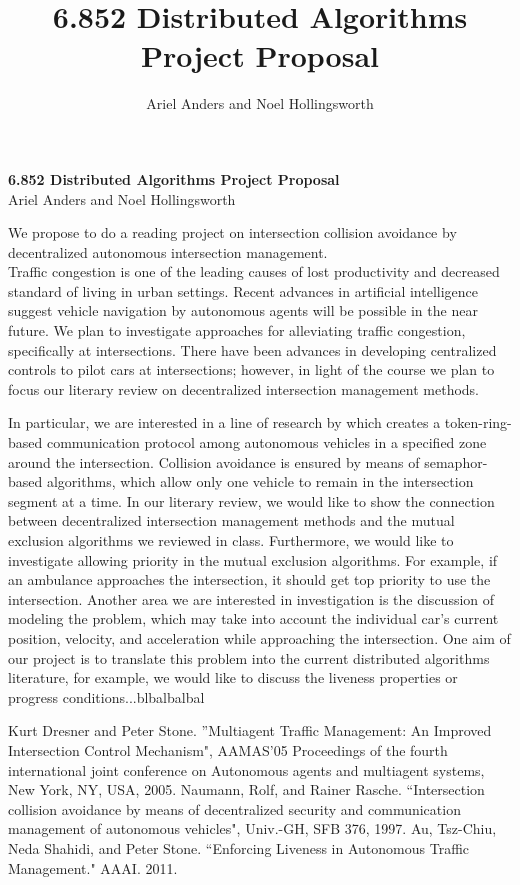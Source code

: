 \documentclass[12pt]{article}
\title{6.852 Distributed Algorithms Project Proposal}
\author{Ariel Anders and Noel Hollingsworth}
\begin{document}
\begin{center}{\bf \Large
6.852 Distributed Algorithms Project Proposal\\ }
Ariel Anders and Noel Hollingsworth 
\end{center}
We propose to do a reading project on intersection collision avoidance by decentralized autonomous intersection management.  \\

Traffic congestion is one of the leading causes of lost productivity and decreased standard of living in urban settings. Recent advances in artificial intelligence suggest vehicle navigation by autonomous agents will be possible in the near future.\cite{dresner}  We plan to investigate approaches for alleviating traffic congestion, specifically at intersections.  There have been advances in developing centralized controls to pilot cars at intersections; however, in light of the course we plan to focus our literary review on decentralized intersection management methods.

In particular, we are interested in a line of research by \cite{naumann} which creates a token-ring-based communication protocol among autonomous vehicles in a specified zone around the intersection.  Collision avoidance is ensured by means of semaphor-based algorithms, which allow only one vehicle to remain in the intersection segment at a time.  In our literary review, we would like to show the connection between decentralized intersection management methods and the mutual exclusion algorithms we reviewed in class.  Furthermore, we would like to investigate allowing priority in the mutual exclusion algorithms.  For example, if an ambulance approaches the intersection, it should get top priority to use the intersection.  Another area we are interested in investigation is the discussion of modeling the problem, which may take into account the individual car's current position, velocity, and acceleration while approaching the intersection.  One aim of our project is to translate this problem into the current distributed algorithms literature, for example, we would like to discuss the liveness properties\cite{tszchiu} or progress conditions...blbalbalbal


\begin{thebibliography}{9}

Kurt Dresner and Peter Stone. ''Multiagent Traffic Management: An Improved Intersection
Control Mechanism", AAMAS'05 Proceedings of the fourth international joint conference on Autonomous agents and multiagent systems, New York, NY, USA, 2005.
Naumann, Rolf, and Rainer Rasche. ``Intersection collision avoidance by means of decentralized security and communication management of autonomous vehicles", Univ.-GH, SFB 376, 1997.
Au, Tsz-Chiu, Neda Shahidi, and Peter Stone. ``Enforcing Liveness in Autonomous Traffic Management." AAAI. 2011.
\end{thebibliography}
\end{document}
